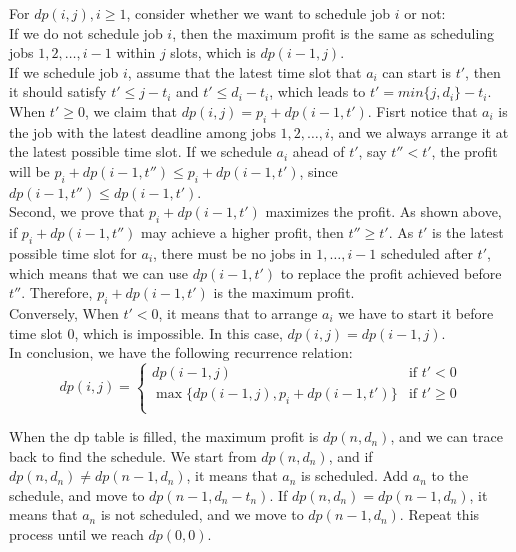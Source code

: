 \documentclass[UTF8]{ctexart}
\begin{document}
For $dp(i,j), i \geq 1$, consider whether we want to schedule job $i$ or not:\\
If we do not schedule job $i$, then the maximum profit is the same as scheduling jobs $1,2, \ldots, i-1$ within $j$ slots, which is $dp(i-1,j)$.\\
If we schedule job $i$, assume that the latest time slot that $a_i$ can start is $t'$, then it should satisfy $t' \leq j-t_i$ and $t' \leq d_i-t_i$, which leads to
$t' = min\{j, d_i\}-t_i$.\\ When $t' \geq 0$, we claim that $dp(i,j) = p_i + dp(i-1, t')$. Fisrt notice that $a_i$ is the job with the latest deadline among jobs $1,2, \ldots, i$, and we
always arrange it at the latest possible time slot. If we schedule $a_i$ ahead of $t'$, say $t'' < t' $,
the profit will be $p_i + dp(i-1, t'') \leq p_i + dp(i-1, t')$, since $dp(i-1,t'') \leq dp(i-1, t')$.\\
Second, we prove that $p_i + dp(i-1, t')$ maximizes the profit. As shown above, if $p_i+ dp(i-1, t'')$ may achieve a higher profit, then $t'' \geq t'$. As $t'$ is the latest possible time slot for $a_i$,
there must be no jobs in $1,\ldots,i-1$ scheduled after $t'$, which means that we can use $dp(i-1, t')$ to replace the profit achieved before $t''$. 
Therefore, $p_i + dp(i-1, t')$ is the maximum profit.\\
Conversely, When $t'<0$, it means that to arrange $a_i$ we have to start it before time slot 0, which is impossible. In this case, $dp(i,j) = dp(i-1,j)$.\\

In conclusion, we have the following recurrence relation:\\
\begin{equation*}
   dp(i,j) = 
\begin{cases} 
dp(i-1,j) & \text{if } t' < 0 \\
\max\{dp(i-1,j), p_i + dp(i-1,t')\} & \text{if } t' \geq 0 \\
\end{cases}
\end{equation*}

When the dp table is filled, the maximum profit is $dp(n,d_n)$, and we can trace back to find the schedule. We start from $dp(n,d_n)$, and if $dp(n,d_n) \neq dp(n-1,d_n)$, it means that $a_n$ is scheduled.
Add $a_n$ to the schedule, and move to $dp(n-1,d_n-t_n)$. If $dp(n,d_n) = dp(n-1,d_n)$, it means that $a_n$ is not scheduled, and we move to $dp(n-1,d_n)$. Repeat this process until we reach $dp(0,0)$.\\
\end{document}

